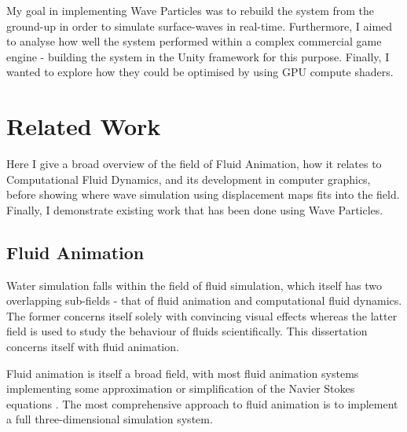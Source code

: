 \documentclass[12pt,a4paper,twoside]{report}
\begin{document}
My goal in implementing Wave Particles was to rebuild the system from the
ground-up in order to simulate surface-waves in real-time. Furthermore, I aimed
to analyse how well the system performed within a complex commercial game
engine - building the system in the Unity framework for this purpose. Finally,
I wanted to explore how they could be optimised by using GPU compute
shaders.


\section{Related Work}
\label{sec:related_work}

Here I give a broad overview of the field of Fluid Animation, how it relates to
Computational Fluid Dynamics, and its development in computer graphics, before
showing where wave simulation using displacement maps fits into the field.
Finally, I demonstrate existing work that has been done using Wave Particles.

\subsection{Fluid Animation}


Water simulation falls within the field of fluid simulation, which itself has two
overlapping sub-fields - that of fluid animation and computational fluid
dynamics. The former concerns itself solely with convincing visual effects
whereas the latter field is used to study the behaviour of fluids
scientifically. This dissertation concerns itself with fluid animation.

Fluid animation is itself a broad field, with most fluid animation systems
implementing some approximation or simplification of the Navier Stokes
equations \cite{NavierStokes} \cite{Stam:1999:SF:311535.311548}
\cite{Irving:2006:ESL:1179352.1141959}. The most comprehensive approach to
fluid animation is to implement a full three-dimensional simulation system.


\end{document}

